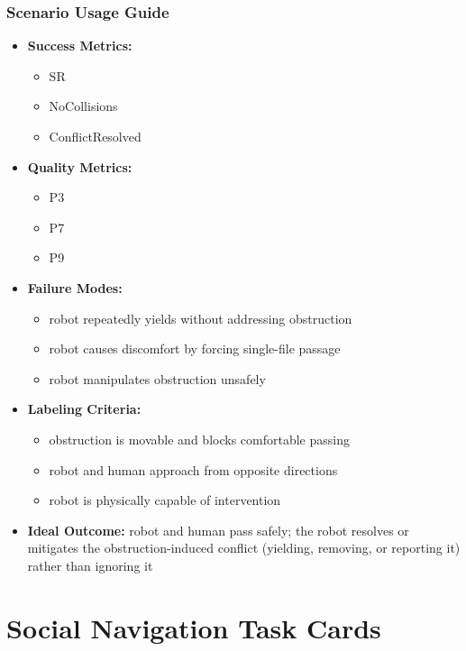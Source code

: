 \documentclass[utf8]{frontiers_suppmat} %
\providecommand{\tightlist}{%
  \setlength{\itemsep}{0pt}\setlength{\parskip}{0pt}}
\begin{document}
\subsubsection{Scenario Usage Guide}\label{scenario-usage-guide}

\begin{itemize}
\tightlist
\item
  \textbf{Success Metrics:}

  \begin{itemize}
  \tightlist
  \item
    SR
  \item
    NoCollisions
  \item
    ConflictResolved
  \end{itemize}
\item
  \textbf{Quality Metrics:}

  \begin{itemize}
  \tightlist
  \item
    P3
  \item
    P7
  \item
    P9
  \end{itemize}
\item
  \textbf{Failure Modes:}

  \begin{itemize}
  \tightlist
  \item
    robot repeatedly yields without addressing obstruction
  \item
    robot causes discomfort by forcing single-file passage
  \item
    robot manipulates obstruction unsafely
  \end{itemize}
\item
  \textbf{Labeling Criteria:}

  \begin{itemize}
  \tightlist
  \item
    obstruction is movable and blocks comfortable passing
  \item
    robot and human approach from opposite directions
  \item
    robot is physically capable of intervention
  \end{itemize}
\item
  \textbf{Ideal Outcome:} robot and human pass safely; the robot
  resolves or mitigates the obstruction-induced conflict (yielding,
  removing, or reporting it) rather than ignoring it
\end{itemize}


\section{Social Navigation Task Cards}
\end{document}
